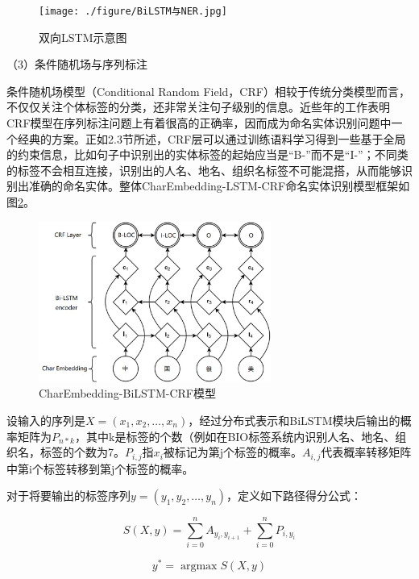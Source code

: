 \documentclass[winfonts,master,oneside,nobackinfo]{njuthesis}
\begin{document}
\begin{figure}[h]
\centering
\texttt{[image: ./figure/BiLSTM与NER.jpg]}
\caption{双向LSTM示意图}
\label{bilstm}
\end{figure}

（3）条件随机场与序列标注

条件随机场模型（Conditional Random Field，CRF）相较于传统分类模型而言，不仅仅关注个体标签的分类，还非常关注句子级别的信息。近些年的工作表明CRF模型在序列标注问题上有着很高的正确率，因而成为命名实体识别问题中一个经典的方案。正如2.3节所述，CRF层可以通过训练语料学习得到一些基于全局的约束信息，比如句子中识别出的实体标签的起始应当是“B-”而不是“I-”；不同类的标签不会相互连接，识别出的人名、地名、组织名标签不可能混搭，从而能够识别出准确的命名实体。整体CharEmbedding-LSTM-CRF命名实体识别模型框架如图\ref{CE-BiLSTM-CRF}。

\begin{figure}[h]
\centering
\includegraphics[width=0.68\textwidth]{./figure/CE-LSTM-CRF.jpg}
\caption{CharEmbedding-BiLSTM-CRF模型}
\label{CE-BiLSTM-CRF}
\end{figure}

设输入的序列是$X=\left(x_{1}, x_{2}, \ldots, x_{n}\right)$，经过分布式表示和BiLSTM模块后输出的概率矩阵为$P_{n * k}$，其中k是标签的个数（例如在BIO标签系统内识别人名、地名、组织名，标签的个数为7。$P_{i, j}$指$x_{i}$被标记为第j个标签的概率。$A_{i, j}$代表概率转移矩阵中第i个标签转移到第j个标签的概率。

对于将要输出的标签序列$y=\left(y_{1}, y_{2}, \ldots, y_{n}\right)$，定义如下路径得分公式：

\begin{equation}
S(X, y)=\sum_{i=0}^{n} A_{y_{i}, y_{i+1}}+\sum_{i=0}^{n} P_{i, y_{i}} 
\end{equation}

\begin{equation}
y^{*}=\operatorname{argmax} S(X, y)
\end{equation}
\end{document}
